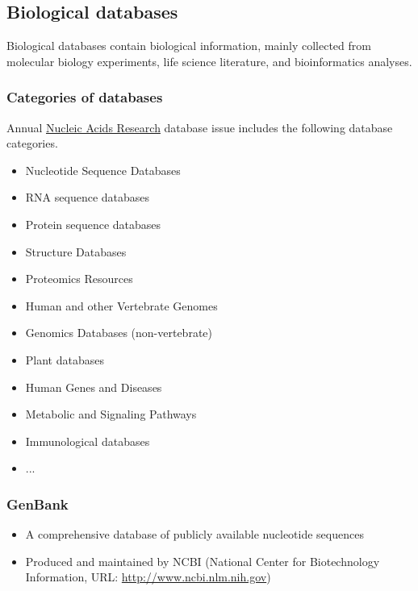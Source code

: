 %
%

%
%
 \subsection{Biological databases}
Biological databases contain biological information, mainly collected from molecular biology experiments, life science literature, and bioinformatics analyses.

%
%
\subsubsection*{Categories of databases} 
Annual \href{http://nar.oxfordjournals.org}{Nucleic Acids Research} database issue includes the following database categories.

\begin{itemize}
\item Nucleotide Sequence Databases
\item RNA sequence databases
\item Protein sequence databases
\item Structure Databases
\item Proteomics Resources
\item Human and other Vertebrate Genomes
\item Genomics Databases (non-vertebrate)
\item Plant databases
\item Human Genes and Diseases
\item Metabolic and Signaling Pathways
\item Immunological databases
\item ...
\end{itemize}

%
%
\subsubsection*{GenBank} 
\begin{itemize}
\item A comprehensive database of publicly available nucleotide sequences
\item Produced and maintained by NCBI (National Center for Biotechnology Information, URL: \href{http://www.ncbi.nlm.nih.gov}{http://www.ncbi.nlm.nih.gov})
\end{itemize}

